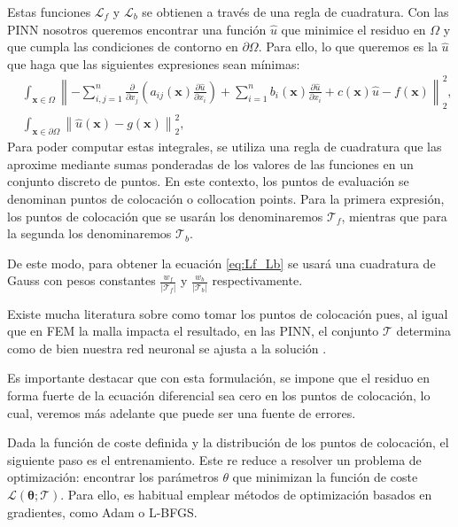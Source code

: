 \documentclass[a4paper,11pt,spanish, twoside, leqno]{tfg-uam}
\theoremstyle{definition}
\begin{document}
Estas funciones $\mathcal{L}_f$ y $\mathcal{L}_b$ se obtienen a través de una regla de cuadratura. Con las PINN nosotros queremos encontrar una función $\hat{u}$ que minimice el residuo en $\Omega$ y que cumpla las condiciones de contorno en $\partial\Omega$. Para ello, lo que queremos es la $\hat{u}$ que haga que las siguientes expresiones sean mínimas:
\begin{align*}
    &\int_{\mathbf{x} \in \Omega} \left\| -\sum_{i,j=1}^{n} \frac{\partial}{\partial x_j}\left( a_{ij}(\mathbf{x})\frac{\partial \hat{u}}{\partial x_i}\right) + \sum_{i=1}^{n} b_i(\mathbf{x})\frac{\partial \hat{u}}{\partial x_i} + c(\mathbf{x})\hat{u} - f(\mathbf{x}) \right\|_2^2, \\ 
    &\int_{\mathbf{x} \in \partial\Omega} \left\| \hat{u} (\mathbf{x}) - g(\mathbf{x})\right\|_2^2,
\end{align*}
Para poder computar estas integrales, se utiliza una regla de cuadratura que las aproxime mediante sumas ponderadas de los valores de las funciones en un conjunto discreto de puntos. En este contexto, los puntos de evaluación se denominan puntos de colocación o collocation points. Para la primera expresión, los puntos de colocación que se usarán los denominaremos $\mathcal{T}_f$, mientras que para la segunda los denominaremos $\mathcal{T}_b$. 

De este modo, para obtener la ecuación \eqref{eq:Lf_Lb} se usará una cuadratura de Gauss con pesos constantes $\frac{w_f}{|\mathcal{T}_f|}$ y $\frac{w_b}{|\mathcal{T}_b|}$ respectivamente. 

Existe mucha literatura sobre como tomar los puntos de colocación pues, al igual que en FEM la malla impacta el resultado, en las PINN, el conjunto $\mathcal{T}$ determina como de bien nuestra red neuronal se ajusta a la solución \cite{münzer2022curriculumtrainingbasedstrategydistributingcollocation}\cite{aikawa2024improving}\cite{matsubara2023goodlatticetrainingphysicsinformed}\cite{subramanian2022adaptiveselfsupervisionalgorithmsphysicsinformed}\cite{hou2023enhancing}.  

Es importante destacar que con esta formulación, se impone que el residuo en forma fuerte de la ecuación diferencial sea cero en los puntos de colocación, lo cual, veremos más adelante que puede ser una fuente de errores. 

Dada la función de coste definida y la distribución de los puntos de colocación, el siguiente paso es el entrenamiento. Este re reduce a resolver un problema de optimización: encontrar los parámetros $\theta$ que minimizan la función de coste $\mathcal{L}(\boldsymbol{\theta}; \mathcal{T})$. Para ello, es habitual emplear métodos de optimización basados en gradientes, como Adam o L-BFGS. 
\end{document}
